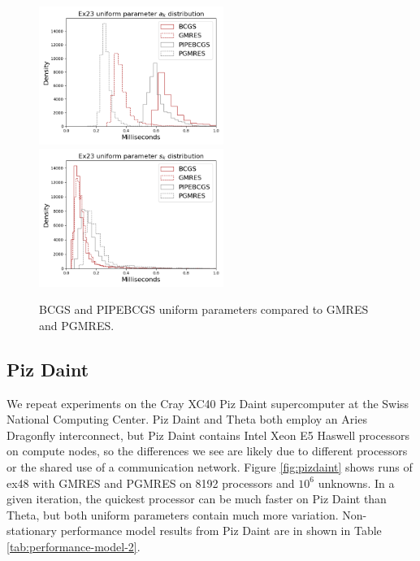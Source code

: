 \documentclass[num-refs]{wiley-article}
\begin{document}
\begin{figure}[t]
\centering
\includegraphics[width=6cm]{../plots/BCGS_GMRES_PIPEBCGS_PGMRES_ex23_8192_1000000_uniform_a_k.png} 
\includegraphics[width=6cm]{../plots/BCGS_GMRES_PIPEBCGS_PGMRES_ex23_8192_1000000_uniform_s_k.png}
\caption{BCGS and PIPEBCGS uniform parameters compared to GMRES and PGMRES.} \label{fig:bcgs}
\end{figure}

\subsection{Piz Daint}\label{sec:pizdaint}

We repeat experiments on the Cray XC40 Piz Daint supercomputer at the Swiss National Computing Center. 
Piz Daint and Theta both employ an Aries Dragonfly interconnect, but Piz Daint contains Intel Xeon E5 Haswell  processors \cite{hammarlund2014haswell} on compute nodes, so the differences we see are likely due to different processors or the shared use of a communication network.
Figure \ref{fig:pizdaint} shows runs of ex48 with GMRES and PGMRES on 8192 processors and $10^6$ unknowns. 
In a given iteration, the quickest processor can be much faster on Piz Daint than Theta, but both uniform parameters contain much more variation.
Non-stationary performance model results from Piz Daint are in shown in Table \ref{tab:performance-model-2}.
\end{document}
